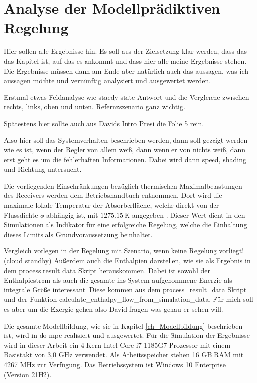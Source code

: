 \chapter{Analyse der Modellprädiktiven Regelung} \label{ch_AnalyseRegelung}
Hier sollen alle Ergebnisse hin.
Es soll aus der Zielsetzung klar werden, dass das das Kapitel ist, auf das es ankommt und dass hier alle meine Ergebnisse stehen.
Die Ergebnisse müssen dann am Ende aber natürlich auch das aussagen, was ich aussagen möchte und vernünftig analysiert und ausgewertet werden.

Erstmal etwas Feldanalyse wie staedy state Antwort und die Vergleiche zwischen rechts, links, oben und unten.
Refernzszenario ganz wichtig.

Spätestens hier sollte auch aus Davids Intro Presi die Folie 5 rein.

Also hier soll das Systemverhalten beschrieben werden, dann soll gezeigt werden wie es ist, wenn der Regler von allem weiß, dann wenn er von nichts weiß, dann erst geht es um die fehlerhaften Informationen.
Dabei wird dann speed, shading und Richtung untersucht.

Die vorliegenden Einschränkungen bezüglich thermischen Maximalbelastungen des Receivers werden dem Betriebshandbuch entnommen.
Dort wird die maximale lokale Temperatur der Absorberfläche, welche direkt von der Flussdichte $\phi$ abhängig ist, mit $\SI{1275.15}{\kelvin}$ angegeben \cite{HandbuchJülich}. Dieser Wert dient in den Simulationen als Indikator für eine erfolgreiche Regelung, welche die Einhaltung dieses Limits als Grundvoraussetzung beinhaltet.

Vergleich vorlegen in der Regelung mit Szenario, wenn keine Regelung vorliegt! (cloud standby)
Außerdem auch die Enthalpien darstellen, wie sie als Ergebnis in dem process result data Skript herauskommen.
Dabei ist sowohl der Enthalpiestrom als auch die gesamte ins System aufgenommene Energie als integrale Größe interessant.
Diese kommen aus dem process_result_data Skript und der Funktion calculate_enthalpy_flow_from_simulation_data.
Für mich soll es aber um die Exergie gehen also David fragen was genau er sehen will.

Die gesamte Modellbildung, wie sie in Kapitel \ref{ch_Modellbildung} beschrieben ist, wird in do-mpc realisiert und ausgewertet.
Für die Simulation der Ergebnisse wird in dieser Arbeit ein 4-Kern Intel Core i7-1185G7 Prozessor mit einem Basistakt von 3,0 GHz verwendet.
Als Arbeitsspeicher stehen 16 GB RAM mit 4267 MHz zur Verfügung.
Das Betriebssystem ist Windows 10 Enterprise (Version 21H2).

